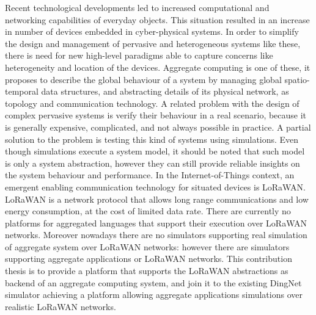 Recent technological developments led to increased computational and networking capabilities of everyday objects. 
This situation resulted in an increase in number of devices embedded in cyber-physical systems.
In order to simplify the design and management of pervasive and heterogeneous systems like these, there is need for new high-level paradigms able to capture concerns like heterogeneity and location of the devices.
Aggregate computing is one of these, it proposes to describe the global behaviour of a system by managing global spatio-temporal data structures, and abstracting details of its physical network, as topology and communication technology.
A related problem with the design of complex pervasive systems is verify their behaviour in a real scenario, because it is generally expensive, complicated, and not always possible in practice.
A partial solution to the problem is testing this kind of systems using simulations.
Even though simulations execute a system model, it should be noted that such model is only a system abstraction, however they can still provide reliable insights on the system behaviour and performance.
In the Internet-of-Things context, an emergent enabling communication technology for situated devices is LoRaWAN.
LoRaWAN is a network protocol that allows long range communications and low energy consumption, at the cost of limited data rate.
There are currently no platforms for aggregated languages that support their execution over LoRaWAN networks.
Moreover nowadays there are no simulators supporting real simulation of aggregate system over \mbox{LoRaWAN} networks: however there are simulators supporting aggregate applications or \mbox{LoRaWAN} networks.
This contribution thesis is to provide a platform that supports the LoRaWAN abstractions as backend of an aggregate computing system, and join it to the existing DingNet simulator achieving a platform allowing aggregate applications simulations over realistic LoRaWAN networks. 
